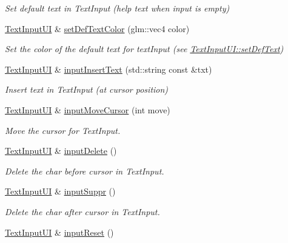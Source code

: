 \begin{DoxyCompactItemize}
\begin{DoxyCompactList}\small\item\em Set default text in Text\+Input (help text when input is empty) \end{DoxyCompactList}\item 
\hyperlink{class_text_input_u_i}{Text\+Input\+UI} \& \hyperlink{class_text_input_u_i_acf64c4a0df48d0316126e1e5ae222b41}{set\+Def\+Text\+Color} (glm\+::vec4 color)
\begin{DoxyCompactList}\small\item\em Set the color of the default text for text\+Input (see \hyperlink{class_text_input_u_i_a7014056f5805634ed5ab0f107c14d581}{Text\+Input\+U\+I\+::set\+Def\+Text}) \end{DoxyCompactList}\item 
\hyperlink{class_text_input_u_i}{Text\+Input\+UI} \& \hyperlink{class_text_input_u_i_a08c35e5485dc1028c9feece06b0a7dcf}{input\+Insert\+Text} (std\+::string const \&txt)
\begin{DoxyCompactList}\small\item\em Insert text in Text\+Input (at cursor position) \end{DoxyCompactList}\item 
\hyperlink{class_text_input_u_i}{Text\+Input\+UI} \& \hyperlink{class_text_input_u_i_a558e6ce9918f6295c7fad84442d9f56d}{input\+Move\+Cursor} (int move)
\begin{DoxyCompactList}\small\item\em Move the cursor for Text\+Input. \end{DoxyCompactList}\item 
\hyperlink{class_text_input_u_i}{Text\+Input\+UI} \& \hyperlink{class_text_input_u_i_ae3a0db51736c336d98655b8384dd78d8}{input\+Delete} ()
\begin{DoxyCompactList}\small\item\em Delete the char before cursor in Text\+Input. \end{DoxyCompactList}\item 
\hyperlink{class_text_input_u_i}{Text\+Input\+UI} \& \hyperlink{class_text_input_u_i_ae7f698f14e09df0c41bead64b41f9d8d}{input\+Suppr} ()
\begin{DoxyCompactList}\small\item\em Delete the char after cursor in Text\+Input. \end{DoxyCompactList}\item 
\hyperlink{class_text_input_u_i}{Text\+Input\+UI} \& \hyperlink{class_text_input_u_i_acd3e059ae54ad2dc237a15f5f5c93596}{input\+Reset} ()

\end{DoxyCompactItemize}

